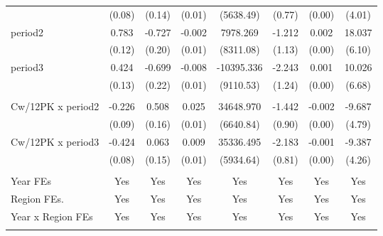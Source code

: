 \begin{landscape}
\begin{table}[H]
{\begin{tabular}{l*{7}{c}}
                    &      (0.08)         &      (0.14)         &      (0.01)         &   (5638.49)         &      (0.77)         &      (0.00)         &      (4.01)         \\
period2            &       0.783\sym{***}&      -0.727\sym{***}&      -0.002         &    7978.269         &      -1.212         &       0.002\sym{*}  &      18.037\sym{**} \\
                    &      (0.12)         &      (0.20)         &      (0.01)         &   (8311.08)         &      (1.13)         &      (0.00)         &      (6.10)         \\
period3            &       0.424\sym{**} &      -0.699\sym{**} &      -0.008         &  -10395.336         &      -2.243         &       0.001         &      10.026         \\
                    &      (0.13)         &      (0.22)         &      (0.01)         &   (9110.53)         &      (1.24)         &      (0.00)         &      (6.68)         \\
\\
Cw/12PK x period2      &      -0.226\sym{*}  &       0.508\sym{**} &       0.025\sym{***}&   34648.970\sym{***}&      -1.442         &      -0.002\sym{**} &      -9.687\sym{*}  \\
                    &      (0.09)         &      (0.16)         &      (0.01)         &   (6640.84)         &      (0.90)         &      (0.00)         &      (4.79)         \\
Cw/12PK x period3      &      -0.424\sym{***}&       0.063         &       0.009         &   35336.495\sym{***}&      -2.183\sym{**} &      -0.001\sym{*}  &      -9.387\sym{*}  \\
                    &      (0.08)         &      (0.15)         &      (0.01)         &   (5934.64)         &      (0.81)         &      (0.00)         &      (4.26)         \\

\\
Year FEs                &       Yes       &     Yes        &     Yes        &     Yes     &      Yes        &    Yes         &     Yes         \\
Region FEs.           &       Yes       &     Yes        &     Yes        &     Yes     &      Yes        &    Yes         &     Yes         \\
Year x Region FEs &       Yes       &     Yes        &     Yes        &     Yes     &      Yes        &    Yes         &     Yes         \\
\\



\end{tabular}}
\end{table}
\end{landscape}
